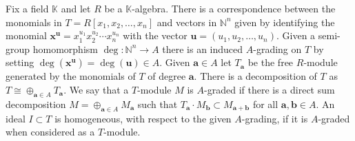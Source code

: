 \documentclass[11pt,reqno]{amsart}
\theoremstyle{remark}
\newtheorem{example}[lemma]{Example}
\renewcommand{\aa}{\mathbf a}
\newcommand{\bb}{\mathbf b}
\newcommand{\xx}{\mathbf x}
\newcommand{\uu}{\mathbf u}
\newcommand{\K}{\mathbb{K}}
\newcommand{\N}{\mathbb{N}}
\newcommand{\Z}{\mathbb{Z}}
\begin{document}

Fix a field $\K$ and let $R$ be a $\K$-algebra. %
There is a correspondence between the monomials in $T=R[x_{1},x_{2},\ldots,x_{n}]$ and vectors in $\N^{n}$ given by identifying the monomial $\xx^{\uu}=x_1^{u_1}x_2^{u_2}\cdots x_n^{u_n}$ with the vector $\uu=(u_1,u_2,\ldots,u_n)$. Given a semi-group homomorphism $\deg:\N^{n}\to A$ there is an induced $A$-grading on $T$ by setting $\deg (\xx^{\uu}) = \deg(\uu)\in A$. Given $\aa\in A$ let $T_{\aa}$ be the free $R$-module generated by the monomials of $T$ of degree $\aa$. There is a decomposition of $T$ as $T\cong \oplus_{\aa\in A} T_{\aa}$. We say that a $T$-module $M$ is $A$-graded if there is a direct sum decomposition $M=\oplus_{\aa\in A} M_{\aa}$ such that $T_{\aa}\cdot M_{\bb} \subset M_{\aa+\bb}$ for all $\aa,\bb\in A$. An ideal $I\subset T$ is homogeneous, with respect to the given $A$-grading, if it is $A$-graded when considered as a $T$-module. 


\end{document}
